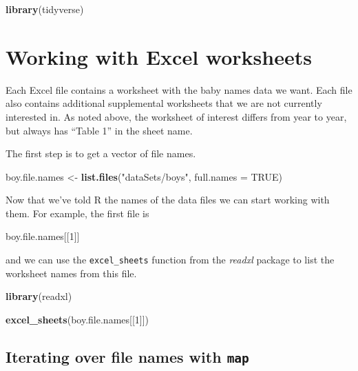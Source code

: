 \documentclass[]{book}
\newenvironment{Shaded}{\begin{snugshade}}{\end{snugshade}}
\newcommand{\KeywordTok}[1]{\textcolor[rgb]{0.13,0.29,0.53}{\textbf{#1}}}
\newcommand{\DataTypeTok}[1]{\textcolor[rgb]{0.13,0.29,0.53}{#1}}
\newcommand{\DecValTok}[1]{\textcolor[rgb]{0.00,0.00,0.81}{#1}}
\newcommand{\StringTok}[1]{\textcolor[rgb]{0.31,0.60,0.02}{#1}}
\newcommand{\OtherTok}[1]{\textcolor[rgb]{0.56,0.35,0.01}{#1}}
\newcommand{\NormalTok}[1]{#1}
\begin{document}
\begin{Shaded}
\begin{Highlighting}[]
\KeywordTok{library}\NormalTok{(tidyverse)}
\end{Highlighting}
\end{Shaded}

\section{Working with Excel
worksheets}\label{working-with-excel-worksheets}

Each Excel file contains a worksheet with the baby names data we want.
Each file also contains additional supplemental worksheets that we are
not currently interested in. As noted above, the worksheet of interest
differs from year to year, but always has ``Table 1'' in the sheet name.

The first step is to get a vector of file names.

\begin{Shaded}
\begin{Highlighting}[]
\NormalTok{boy.file.names <-}\StringTok{ }\KeywordTok{list.files}\NormalTok{(}\StringTok{"dataSets/boys"}\NormalTok{, }\DataTypeTok{full.names =} \OtherTok{TRUE}\NormalTok{)}
\end{Highlighting}
\end{Shaded}

Now that we've told R the names of the data files we can start working
with them. For example, the first file is

\begin{Shaded}
\begin{Highlighting}[]
\NormalTok{boy.file.names[[}\DecValTok{1}\NormalTok{]]}
\end{Highlighting}
\end{Shaded}

and we can use the \texttt{excel\_sheets} function from the
\emph{readxl} package to list the worksheet names from this file.

\begin{Shaded}
\begin{Highlighting}[]
\KeywordTok{library}\NormalTok{(readxl)}

\KeywordTok{excel_sheets}\NormalTok{(boy.file.names[[}\DecValTok{1}\NormalTok{]])}
\end{Highlighting}
\end{Shaded}

\subsection{\texorpdfstring{Iterating over file names with
\texttt{map}}{Iterating over file names with map}}\label{iterating-over-file-names-with-map}
\end{document}
